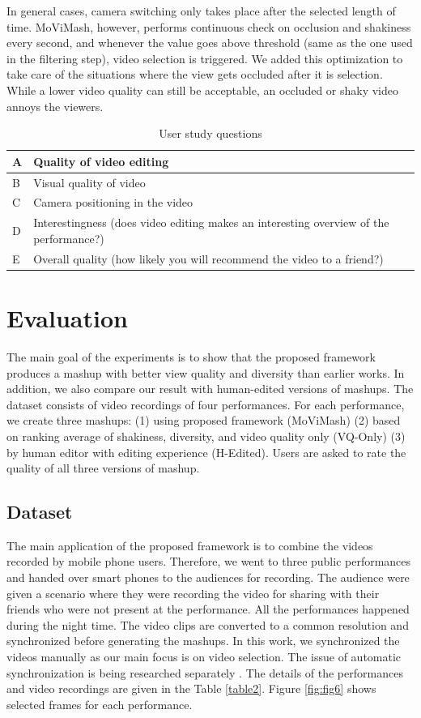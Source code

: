 \documentclass{sig-alternate}
\providecommand{\DIFadd}[1]{{\protect\color{blue}\uwave{#1}}} %
\providecommand{\DIFaddbegin}{} %
\providecommand{\DIFaddend}{} %
\begin{document}
In general cases, camera switching only takes place after the selected length of time. MoViMash, however, performs continuous
check on occlusion and shakiness every second, and whenever the
value goes above threshold (same as the one used in the filtering
step), video selection is triggered. We added this optimization to
take care of the situations where the view gets occluded after it is selection. While a lower video quality can still be acceptable, an occluded or shaky video annoys the viewers.

\begin{table}
\small
\centering
\caption{User study questions}
\label{table3}
\begin{tabularx}{8cm}{p{0.15cm}|p{7.2cm}}
\hline
A & Quality of video editing\\
\hline
B & Visual quality of video\\
\hline
C & Camera positioning in the video\\
\hline
D & Interestingness (does video editing makes an interesting
overview of the performance?)\\
\hline
E & Overall quality (how likely you will recommend the video to
a friend?)\\
\hline
\end{tabularx}
\end{table}

\section{Evaluation}\label{eval}
\DIFaddbegin \DIFadd{I am adding one sentence per section.
}\DIFaddend The main goal of the experiments is to show that the proposed
framework produces a mashup with better view quality and diversity
than earlier works. In addition, we also compare our result with
human-edited versions of mashups. The dataset consists of video
recordings of four performances. For each performance, we create
three mashups: (1) using proposed framework (MoViMash) (2) based on ranking average of shakiness, diversity, and video quality only (VQ-Only) (3) by human editor with editing experience (H-Edited).
Users are asked to rate the quality of all three versions of mashup.

\subsection{Dataset}
The main application of the proposed framework is to combine
the videos recorded by mobile phone users. Therefore, we went to
three public performances and handed over smart phones to the audiences for recording. The audience were given a scenario where
they were recording the video for sharing with their friends who
were not present at the performance. All the performances happened
during the night time. The video clips are converted to a common resolution and synchronized before generating the mashups. In this work, we synchronized the videos manually as our main focus is on video selection. The issue of automatic synchronization is being researched separately \cite{14}. The details of the performances and video recordings are given in the Table \ref{table2}. Figure \ref{fig:fig6} shows selected frames for each performance.
\end{document}

